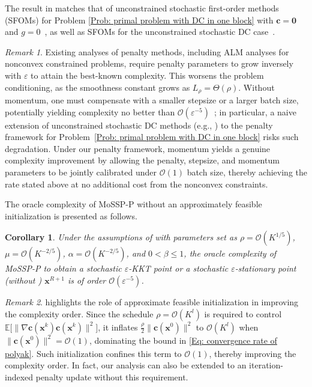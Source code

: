 \documentclass{article}
\theoremstyle{plain}
\newtheorem{corollary}{Corollary}[section]
\theoremstyle{definition}
\theoremstyle{remark}
\newtheorem{remark}{Remark}[section]
\newcommand{\zero}{\bm{0}}
\newcommand{\bx}{\bm{x}}
\newcommand{\bc}{\bm{c}}
\newcommand{\calO}{\mathcal{O}}
\numberwithin{equation}{section}
\begin{document}
The result in  matches that of unconstrained stochastic first-order methods (SFOMs) for Problem \eqref{Prob: primal problem with DC in one block} with \(\bc = \zero\) and \(g = 0\)~\cite{ghadimi2013stochastic,gao2024non}, as well as SFOMs for the unconstrained stochastic DC case~\cite{chayti2025stochastic,hu2024single,xu2019stochastic}.
\begin{remark}\label{Remark: role of momentum}
Existing analyses of penalty methods, including ALM analyses for nonconvex constrained problems, require penalty parameters to grow inversely with $\varepsilon$ to attain the best-known complexity. This worsens the problem conditioning, as the smoothness constant grows as $L_{\rho} = \Theta(\rho)$. Without momentum, one must compensate with a smaller stepsize or a larger batch size, potentially yielding complexity no better than $\calO(\varepsilon^{-5})$~\cite{jin2022stochastic}; in particular, a naive extension of unconstrained stochastic DC methods (e.g., \cite{hu2024single,xu2019stochastic}) to the penalty framework for Problem~\eqref{Prob: primal problem with DC in one block} risks such degradation. Under our penalty framework, momentum yields a genuine complexity
improvement by allowing the penalty, stepsize, and momentum parameters to be jointly calibrated under $\calO(1)$ batch size, thereby achieving the rate stated above at no additional cost from the nonconvex constraints.
\end{remark}

The oracle complexity of MoSSP-P without an approximately feasible initialization is presented as follows.
\begin{corollary}
    \label{Theorem: the basic convergence rate of Polyak without initial feasibility}
     Under the assumptions of  with parameters set as $\rho = \calO(K^{1/5})$, $\mu = \calO(K^{-2/5})$, $\alpha = \calO(K^{-2/5})$, and $0 < \beta \leq 1$, the oracle complexity of MoSSP-P
     to obtain a stochastic $\varepsilon$-KKT point or a stochastic $\varepsilon$-stationary point (without ) $\bx^{R+1}$ is of order $\calO(\varepsilon^{-5})$.
\end{corollary}
\begin{remark}
 highlights the role of approximate feasible initialization in improving the complexity order. Since the schedule $\rho = \calO(K^{l})$ is required to control $\mathbb{E}\bigl[\|\nabla \bc(\bx^{k}) \bc(\bx^{k})\|^2\bigr]$, it inflates $\tfrac{\rho}{2}\|\bc(\bx^{0})\|^{2}$ to $\calO(K^{l})$ when $\|\bc(\bx^{0})\|^{2} = \calO(1)$, dominating the bound in \eqref{Eq: convergence rate of polyak}. Such initialization confines this term to $\calO(1)$, thereby improving the complexity order. In fact, our analysis can also be extended to an iteration-indexed penalty update \cite{Alacaoglu2023ComplexityOS} without this requirement.
\end{remark}
\end{document}
